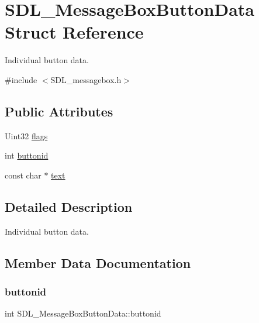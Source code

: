 \hypertarget{structSDL__MessageBoxButtonData}{}\section{S\+D\+L\+\_\+\+Message\+Box\+Button\+Data Struct Reference}
\label{structSDL__MessageBoxButtonData}


Individual button data.  




{\ttfamily \#include $<$S\+D\+L\+\_\+messagebox.\+h$>$}

\subsection*{Public Attributes}
\begin{DoxyCompactItemize}
\item 
Uint32 \hyperlink{structSDL__MessageBoxButtonData_a426c8b5da0e718242c7840706d95de0b}{flags}
\item 
int \hyperlink{structSDL__MessageBoxButtonData_a22938886a6b13792006cc5c91fa38e92}{buttonid}
\item 
const char $\ast$ \hyperlink{structSDL__MessageBoxButtonData_af35f3062f0577159284c8828caaf08e4}{text}
\end{DoxyCompactItemize}


\subsection{Detailed Description}
Individual button data. 

\subsection{Member Data Documentation}
\mbox{\label{structSDL__MessageBoxButtonData_a22938886a6b13792006cc5c91fa38e92}} 
\subsubsection{\texorpdfstring{buttonid}{buttonid}}
{\footnotesize\ttfamily int S\+D\+L\+\_\+\+Message\+Box\+Button\+Data\+::buttonid}


